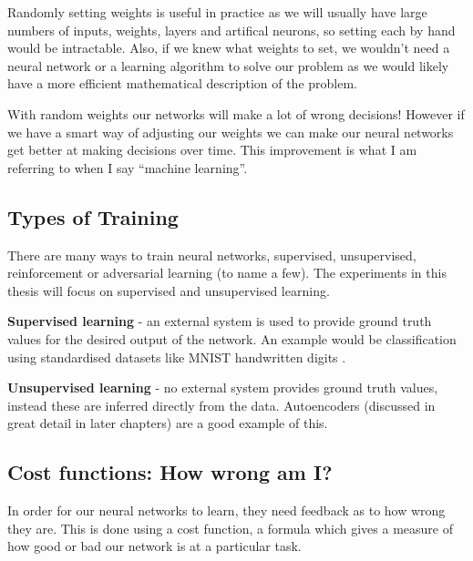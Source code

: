 Randomly setting weights is useful in practice as we will usually have large numbers of inputs, weights, layers and artifical neurons, so setting each by hand would be intractable. Also, if we knew what weights to set, we wouldn't need a neural network or a learning algorithm to solve our problem as we would likely have a more efficient mathematical description of the problem.

With random weights our networks will make a lot of wrong decisions! However if we have a smart way of adjusting our weights we can make our neural networks get better at making decisions over time. This improvement is what I am referring to when I say ``machine learning''.

\subsection{Types of Training}
There are many ways to train neural networks, supervised, unsupervised, reinforcement or 
adversarial learning (to name a few). The experiments in this thesis will focus on supervised and unsupervised learning. %


\textbf{Supervised learning} - an external system is used to provide ground truth values for the desired output of the network. An example would be classification using standardised datasets like MNIST handwritten digits \cite{lecun1998mnist}.


\textbf{Unsupervised learning} - no external system provides ground truth values, instead these are inferred directly from the data. Autoencoders (discussed in great detail in later chapters) are a good example of this.  




\subsection{Cost functions: How wrong am I?}
In order for our neural networks to learn, they need feedback as to how wrong they are. This is done using a cost function, a formula which gives a measure of how good or bad our network is at a particular task.

